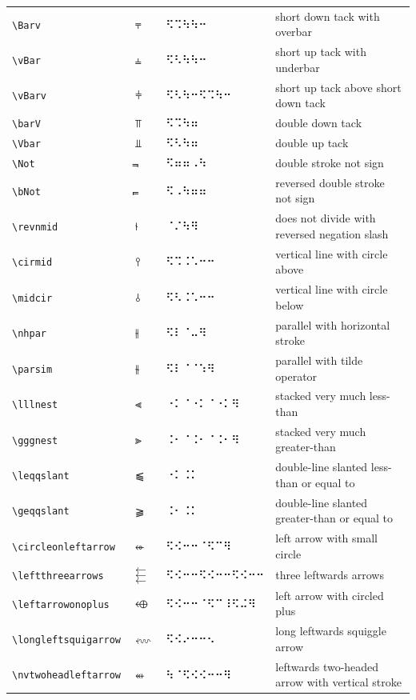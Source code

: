\documentclass[oneside]{article}
\begin{document}
\begin{longtable}{llll}
\verb|\Barv| & $\Barv$ &   ⠫⠩⠳⠳⠒   & {short down tack with overbar} \\[2ex]
\verb|\vBar| & $\vBar$ &   ⠫⠣⠳⠳⠒   & {short up tack with underbar} \\[2ex]
\verb|\vBarv| & $\vBarv$ &   ⠫⠣⠳⠒⠫⠩⠳⠒   & {short up tack above short down tack} \\[2ex]
\verb|\barV| & $\barV$ &   ⠫⠩⠳⠶   & {double down tack} \\[2ex]
\verb|\Vbar| & $\Vbar$ &   ⠫⠣⠳⠶   & {double up tack} \\[2ex]
\verb|\Not| & $\Not$ &   ⠫⠶⠶⠠⠳   & {double stroke not sign} \\[2ex]
\verb|\bNot| & $\bNot$ &   ⠫⠠⠳⠶⠶   & {reversed double stroke not sign} \\[2ex]
\verb|\revnmid| & $\revnmid$ &   ⠈⠌⠳⠻   & {does not divide with reversed negation slash} \\[2ex]
\verb|\cirmid| & $\cirmid$ &   ⠫⠩⠨⠡⠒⠒   & {vertical line with circle above} \\[2ex]
\verb|\midcir| & $\midcir$ &   ⠫⠣⠨⠡⠒⠒   & {vertical line with circle below} \\[2ex]
\verb|\nhpar| & $\nhpar$ &   ⠫⠇⠈⠤⠻   & {parallel with horizontal stroke} \\[2ex]
\verb|\parsim| & $\parsim$ &   ⠫⠇⠈⠈⠱⠻   & {parallel with tilde operator} \\[2ex]
\verb|\lllnest| & $\lllnest$ &   ⠐⠅⠈⠐⠅⠈⠐⠅⠻   & {stacked very much less-than} \\[2ex]
\verb|\gggnest| & $\gggnest$ &   ⠨⠂⠈⠨⠂⠈⠨⠂⠻   & {stacked very much greater-than} \\[2ex]
\verb|\leqqslant| & $\leqqslant$ &   ⠐⠅⠨⠅   & {double-line slanted less-than or equal to} \\[2ex]
\verb|\geqqslant| & $\geqqslant$ &   ⠨⠂⠨⠅   & {double-line slanted greater-than or equal to} \\[2ex]
\verb|\circleonleftarrow| & $\circleonleftarrow$ &   ⠫⠪⠒⠒⠈⠫⠉⠻   & {left arrow with small circle} \\[2ex]
\verb|\leftthreearrows| & $\leftthreearrows$ &   ⠫⠪⠒⠒⠫⠪⠒⠒⠫⠪⠒⠒   & {three leftwards arrows} \\[2ex]
\verb|\leftarrowonoplus| & $\leftarrowonoplus$ &   ⠫⠪⠒⠒⠈⠫⠉⠸⠫⠬⠻   & {left arrow with circled plus} \\[2ex]
\verb|\longleftsquigarrow| & $\longleftsquigarrow$ &   ⠫⠪⠔⠒⠒⠢   & {long leftwards squiggle arrow} \\[2ex]
\verb|\nvtwoheadleftarrow| & $\nvtwoheadleftarrow$ &   ⠳⠈⠫⠪⠪⠒⠒⠻   & {leftwards two-headed arrow with vertical stroke} \\[2ex]

\end{longtable}
\end{document}
